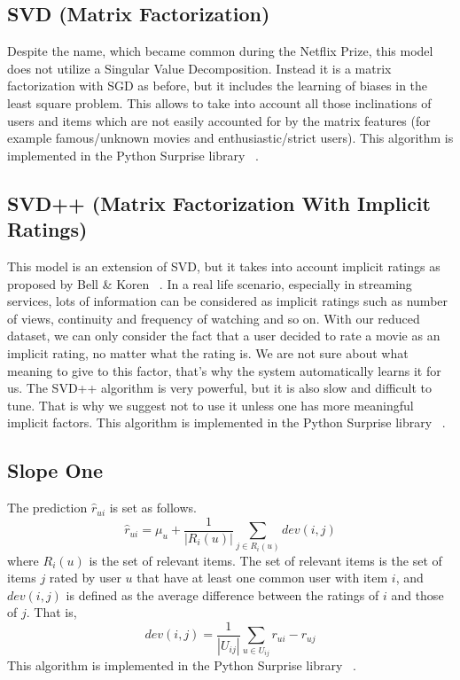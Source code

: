 \documentclass[10pt,conference,compsocconf]{IEEEtran}
\begin{document}
\subsection{SVD (Matrix Factorization)}
Despite the name, which became common during the Netflix Prize, this model does not utilize a Singular Value Decomposition. Instead it is a matrix factorization with SGD as before, but it includes the learning of biases in the least square problem. This allows to take into account all those inclinations of users and items which are not easily accounted for by the matrix features (for example famous/unknown movies and enthusiastic/strict users). This algorithm is implemented in the Python Surprise library ~\cite{Surprise}.
\subsection{SVD++ (Matrix Factorization With Implicit Ratings)}
This model is an extension of SVD, but it takes into account implicit ratings as proposed by Bell \& Koren ~\cite{koren2008factorization, koren2010factor}. In a real life scenario, especially in streaming services, lots of information can be considered as implicit ratings such as number of views, continuity and frequency of watching and so on. With our reduced dataset, we can only consider the fact that a user decided to rate a movie as an implicit rating, no matter what the rating is. We are not sure about what meaning to give to this factor, that's why the system automatically learns it for us. The SVD++ algorithm is very powerful, but it is also slow and difficult to tune. That is why we suggest not to use it unless one has more meaningful implicit factors. This algorithm is implemented in the Python Surprise library ~\cite{Surprise}.
\subsection{Slope One}
The prediction $\hat{r}_{ui}$ is set as follows.
\begin{equation}
\hat{r}_{ui} = \mu _u + \frac{1}{|R_{i}(u)|} \sum_{j \in R_{i}(u)}{}  dev(i, j)
\end{equation}
where $R_{i}(u)$ is the set of relevant items. The set of relevant items is the set of items $j$ rated by user $u$ that have at least one common user with item $i$, and $dev(i,j)$ is defined as the average difference between the ratings of $i$ and those of $j$. That is,
\begin{equation}
dev(i, j) = \frac{1}{|U_{ij}|} \sum_{u \in U_{ij}}{} r_{ui} - r_{uj}
\end{equation}
This algorithm is implemented in the Python Surprise library ~\cite{Surprise}.
\end{document}
